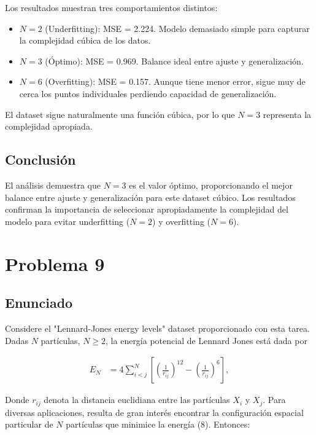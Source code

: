 \documentclass{article}
\begin{document}
Los resultados muestran tres comportamientos distintos:

\begin{itemize}
    \item $N=2$ (Underfitting): MSE = 2.224. Modelo demasiado simple para capturar la complejidad cúbica de los datos.
    \item $N=3$ (Óptimo): MSE = 0.969. Balance ideal entre ajuste y generalización.
    \item $N=6$ (Overfitting): MSE = 0.157. Aunque tiene menor error, sigue muy de cerca los puntos individuales perdiendo capacidad de generalización.
\end{itemize}

El dataset sigue naturalmente una función cúbica, por lo que $N=3$ representa la complejidad apropiada.

\subsection{Conclusión}

El análisis demuestra que $N=3$ es el valor óptimo, proporcionando el mejor balance entre ajuste y generalización para este dataset cúbico. Los resultados confirman la importancia de seleccionar apropiadamente la complejidad del modelo para evitar underfitting ($N=2$) y overfitting ($N=6$).

\section{Problema 9}

\subsection{Enunciado}

Considere el "Lennard-Jones energy levels" dataset proporcionado con esta tarea. Dadas $N$ partículas, $N \ge 2$, la energía potencial de Lennard Jones está dada por

\begin{align} \tag{8}
    E_N &= 4 \sum_{i<j}^{N} \left[ \left(\frac{1}{r_{ij}}\right)^{12} - \left(\frac{1}{r_{ij}}\right)^{6} \right],
\end{align}

Donde $r_{ij}$ denota la distancia euclidiana entre las partículas $X_i$ y $X_j$. Para diversas aplicaciones, resulta de gran interés encontrar la configuración espacial particular de $N$ partículas que minimice la energía (8). Entonces:
\end{document}
